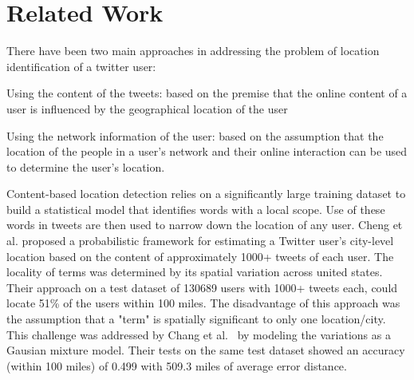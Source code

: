 \section{Related Work}
\label{sec:RelatedWork}
There have been two main approaches in addressing the problem of location identification of a twitter user: \begin{inparaenum}[(1)] 
\item Using the content of the tweets: based on the premise that the online content of a user is influenced by the geographical location of the user
\item Using the network information of the user: based on the assumption that the location of the people in a user's network and their online interaction can be used to determine the user's location.
\end{inparaenum}

Content-based location detection relies on a significantly large training dataset to build a statistical model that identifies words with a local scope. Use of these words in tweets are then used to narrow down the location of any user. Cheng et al. \cite{cheng2010you} proposed a probabilistic framework for estimating a Twitter user's city-level location based on the content of approximately 1000+ tweets of each user. The locality of terms was determined by its spatial variation across united states. Their approach on a test dataset of 130689 users with 1000+ tweets each, could locate 51\% of the users within 100 miles. The disadvantage of this approach was the assumption that a "term" is spatially significant to only one location/city. This challenge was addressed by Chang et al.~\cite{chang2012phillies} by modeling the variations as a Gausian mixture model. Their tests on the same test dataset showed an accuracy (within 100 miles) of 0.499 with 509.3 miles of average error distance.

